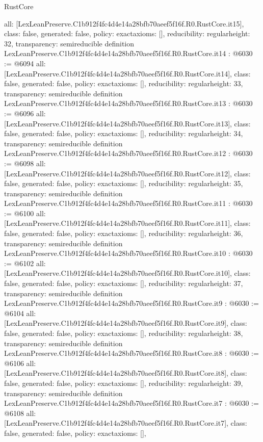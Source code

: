 \begin{lexlean}{RustCore}
\begin{coremodule}
{  all: [LexLeanPreserve.C1b912f4fc4d4e14a28bfb70aeef5f16f.R0.RustCore.it15],
  class: false,
  generated: false,
  policy: exact{axioms: []},
  reducibility: regular{height: 32},
  transparency: semireducible
}
definition LexLeanPreserve.C1b912f4fc4d4e14a28bfb70aeef5f16f.R0.RustCore.it14 : @6030 := @6094 {
  all: [LexLeanPreserve.C1b912f4fc4d4e14a28bfb70aeef5f16f.R0.RustCore.it14],
  class: false,
  generated: false,
  policy: exact{axioms: []},
  reducibility: regular{height: 33},
  transparency: semireducible
}
definition LexLeanPreserve.C1b912f4fc4d4e14a28bfb70aeef5f16f.R0.RustCore.it13 : @6030 := @6096 {
  all: [LexLeanPreserve.C1b912f4fc4d4e14a28bfb70aeef5f16f.R0.RustCore.it13],
  class: false,
  generated: false,
  policy: exact{axioms: []},
  reducibility: regular{height: 34},
  transparency: semireducible
}
definition LexLeanPreserve.C1b912f4fc4d4e14a28bfb70aeef5f16f.R0.RustCore.it12 : @6030 := @6098 {
  all: [LexLeanPreserve.C1b912f4fc4d4e14a28bfb70aeef5f16f.R0.RustCore.it12],
  class: false,
  generated: false,
  policy: exact{axioms: []},
  reducibility: regular{height: 35},
  transparency: semireducible
}
definition LexLeanPreserve.C1b912f4fc4d4e14a28bfb70aeef5f16f.R0.RustCore.it11 : @6030 := @6100 {
  all: [LexLeanPreserve.C1b912f4fc4d4e14a28bfb70aeef5f16f.R0.RustCore.it11],
  class: false,
  generated: false,
  policy: exact{axioms: []},
  reducibility: regular{height: 36},
  transparency: semireducible
}
definition LexLeanPreserve.C1b912f4fc4d4e14a28bfb70aeef5f16f.R0.RustCore.it10 : @6030 := @6102 {
  all: [LexLeanPreserve.C1b912f4fc4d4e14a28bfb70aeef5f16f.R0.RustCore.it10],
  class: false,
  generated: false,
  policy: exact{axioms: []},
  reducibility: regular{height: 37},
  transparency: semireducible
}
definition LexLeanPreserve.C1b912f4fc4d4e14a28bfb70aeef5f16f.R0.RustCore.it9 : @6030 := @6104 {
  all: [LexLeanPreserve.C1b912f4fc4d4e14a28bfb70aeef5f16f.R0.RustCore.it9],
  class: false,
  generated: false,
  policy: exact{axioms: []},
  reducibility: regular{height: 38},
  transparency: semireducible
}
definition LexLeanPreserve.C1b912f4fc4d4e14a28bfb70aeef5f16f.R0.RustCore.it8 : @6030 := @6106 {
  all: [LexLeanPreserve.C1b912f4fc4d4e14a28bfb70aeef5f16f.R0.RustCore.it8],
  class: false,
  generated: false,
  policy: exact{axioms: []},
  reducibility: regular{height: 39},
  transparency: semireducible
}
definition LexLeanPreserve.C1b912f4fc4d4e14a28bfb70aeef5f16f.R0.RustCore.it7 : @6030 := @6108 {
  all: [LexLeanPreserve.C1b912f4fc4d4e14a28bfb70aeef5f16f.R0.RustCore.it7],
  class: false,
  generated: false,
  policy: exact{axioms: []},
}
\end{coremodule}
\end{lexlean}
